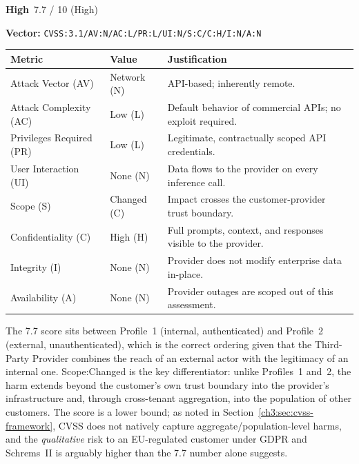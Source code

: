\documentclass[12pt,a4paper]{report}
\newcommand{\badgehigh}{\colorbox{gray!15}{\footnotesize\textbf{High}}}
\newcommand{\cvssvec}[1]{\texttt{\small #1}}
\begin{document}
\begin{cvssbox}{\badgehigh\ 7.7 / 10 (High)}
\vspace{2pt}
\begin{center}
\textbf{Vector:}\enspace
\cvssvec{CVSS:3.1/AV:N/AC:L/PR:L/UI:N/S:C/C:H/I:N/A:N}
\end{center}
\vspace{8pt}
\begin{tabular}{W{3.4cm}W{2.2cm}W{7.8cm}}
\toprule
  
  \small\textbf{Metric} &
  \small\textbf{Value} &
  \small\textbf{Justification} \\
  \midrule
  
  \small Attack Vector (AV)     & \small Network (N) & \small API-based; inherently remote. \\
  
  \small Attack Complexity (AC) & \small Low (L)     & \small Default behavior of commercial APIs; no exploit required. \\
  
  \small Privileges Required (PR)  & \small Low (L)  & \small Legitimate, contractually scoped API credentials. \\
  
  \small User Interaction (UI)  & \small None (N)    & \small Data flows to the provider on every inference call. \\
  
  \small Scope (S)              & \small Changed (C) & \small Impact crosses the customer-provider trust boundary. \\
  
  \small Confidentiality (C)    & \small High (H)    & \small Full prompts, context, and responses visible to the provider. \\
  
  \small Integrity (I)          & \small None (N)    & \small Provider does not modify enterprise data in-place. \\
  
  \small Availability (A)       & \small None (N)    & \small Provider outages are scoped out of this assessment. \\
  \bottomrule
\end{tabular}
\vspace{6pt}

\small The 7.7 score sits between Profile~1 (internal, authenticated) and
Profile~2 (external, unauthenticated), which is the correct ordering
given that the Third-Party Provider combines the reach of an external
actor with the legitimacy of an internal one. Scope:Changed is the key
differentiator: unlike Profiles~1 and~2, the harm extends beyond the
customer's own trust boundary into the provider's infrastructure and,
through cross-tenant aggregation, into the population of other customers.
The score is a lower bound; as noted in Section~\ref{ch3:sec:cvss-framework},
CVSS does not natively capture aggregate/population-level harms, and the
\emph{qualitative} risk to an EU-regulated customer under GDPR and
Schrems~II is arguably higher than the 7.7 number alone suggests.
\end{cvssbox}
\end{document}
